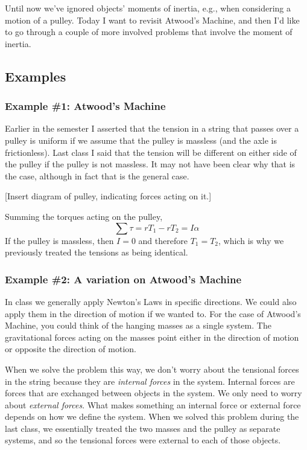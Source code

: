 Until now we've ignored objects' moments of inertia, e.g., when considering a motion of a pulley. Today I want to revisit Atwood's Machine, and then I'd like to go through a couple of more involved problems that involve the moment of inertia.

\subsection{Examples}
\subsubsection{Example \#1: Atwood's Machine}
Earlier in the semester I asserted that the tension in a string that passes over a pulley is uniform if we assume that the pulley is massless (and the axle is frictionless). Last class I said that the tension will be different on either side of the pulley if the pulley is not massless. It may not have been clear why that is the case, although in fact that is the general case.

[Insert diagram of pulley, indicating forces acting on it.]
\vspace{5cm}

Summing the torques acting on the pulley,
$$\sum \tau = rT_1-rT_2 = I\alpha$$
If the pulley is massless, then $I=0$ and therefore $T_1=T_2$, which is why we previously treated the tensions as being identical.

\subsubsection{Example \#2: A variation on Atwood's Machine}
In class we generally apply Newton's Laws in specific directions. We could also apply them in the direction of motion if we wanted to. For the case of Atwood's Machine, you could think of the hanging masses as a single system. The gravitational forces acting on the masses point either in the direction of motion or opposite the direction of motion.

When we solve the problem this way, we don't worry about the tensional forces in the string because they are \textit{internal forces} in the system. Internal forces are forces that are exchanged between objects in the system. We only need to worry about \textit{external forces}. What makes something an internal force or external force depends on how we define the system. When we solved this problem during the last class, we essentially treated the two masses and the pulley as separate systems, and so the tensional forces were external to each of those objects.

